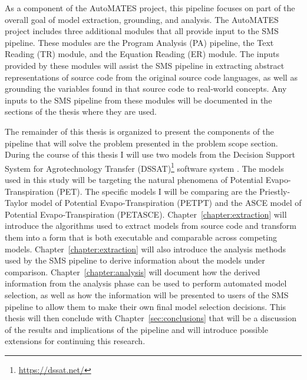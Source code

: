 As a component of the AutoMATES project, this pipeline focuses on part of the overall goal of model extraction, grounding, and analysis.
The AutoMATES project includes three additional modules that all provide input to the SMS pipeline.
These modules are the Program Analysis (PA) pipeline, the Text Reading (TR) module, and the Equation Reading (ER) module.
The inputs provided by these modules will assist the SMS pipeline in extracting abstract representations of source code from the original source code languages, as well as grounding the variables found in that source code to real-world concepts.
Any inputs to the SMS pipeline from these modules will be documented in the sections of the thesis where they are used.

The remainder of this thesis is organized to present the components of the pipeline that will solve the problem presented in the problem scope section.
During the course of this thesis I will use two models from the Decision Support System for Agrotechnology Transfer (DSSAT)\footnote{\url{https://dssat.net/}} software system \citep{DSSAT}.
The models used in this study will be targeting the natural phenomena of Potential Evapo-Transpiration (PET).
The specific models I will be comparing are the Priestly-Taylor model of Potential Evapo-Transpiration (PETPT) and the ASCE model of Potential Evapo-Transpiration (PETASCE).
Chapter~\ref{chapter:extraction} will introduce the algorithms used to extract models from source code and transform them into a form that is both executable and comparable across competing models.
Chapter~\ref{chapter:extraction} will also introduce the analysis methods used by the SMS pipeline to derive information about the models under comparison.
Chapter~\ref{chapter:analysis} will document how the derived information from the analysis phase can be used to perform automated model selection, as well as how the information will be presented to users of the SMS pipeline to allow them to make their own final model selection decisions.
This thesis will then conclude with Chapter~\ref{sec:conclusions} that will be a discussion of the results and implications of the pipeline and will introduce possible extensions for continuing this research.
